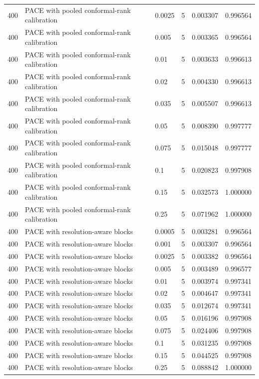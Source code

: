 \begin{tabular}{llllll}
400 & PACE with pooled conformal-rank calibration & 0.0025 & 5 & 0.003307 & 0.996564 \\
400 & PACE with pooled conformal-rank calibration & 0.005 & 5 & 0.003365 & 0.996564 \\
400 & PACE with pooled conformal-rank calibration & 0.01 & 5 & 0.003633 & 0.996613 \\
400 & PACE with pooled conformal-rank calibration & 0.02 & 5 & 0.004330 & 0.996613 \\
400 & PACE with pooled conformal-rank calibration & 0.035 & 5 & 0.005507 & 0.996613 \\
400 & PACE with pooled conformal-rank calibration & 0.05 & 5 & 0.008390 & 0.997777 \\
400 & PACE with pooled conformal-rank calibration & 0.075 & 5 & 0.015048 & 0.997777 \\
400 & PACE with pooled conformal-rank calibration & 0.1 & 5 & 0.020823 & 0.997908 \\
400 & PACE with pooled conformal-rank calibration & 0.15 & 5 & 0.032573 & 1.000000 \\
400 & PACE with pooled conformal-rank calibration & 0.25 & 5 & 0.071962 & 1.000000 \\
400 & PACE with resolution-aware blocks & 0.0005 & 5 & 0.003281 & 0.996564 \\
400 & PACE with resolution-aware blocks & 0.001 & 5 & 0.003307 & 0.996564 \\
400 & PACE with resolution-aware blocks & 0.0025 & 5 & 0.003382 & 0.996564 \\
400 & PACE with resolution-aware blocks & 0.005 & 5 & 0.003489 & 0.996577 \\
400 & PACE with resolution-aware blocks & 0.01 & 5 & 0.003974 & 0.997341 \\
400 & PACE with resolution-aware blocks & 0.02 & 5 & 0.004647 & 0.997341 \\
400 & PACE with resolution-aware blocks & 0.035 & 5 & 0.012674 & 0.997341 \\
400 & PACE with resolution-aware blocks & 0.05 & 5 & 0.016196 & 0.997908 \\
400 & PACE with resolution-aware blocks & 0.075 & 5 & 0.024406 & 0.997908 \\
400 & PACE with resolution-aware blocks & 0.1 & 5 & 0.031235 & 0.997908 \\
400 & PACE with resolution-aware blocks & 0.15 & 5 & 0.044525 & 0.997908 \\
400 & PACE with resolution-aware blocks & 0.25 & 5 & 0.088842 & 1.000000 \\

\end{tabular}
